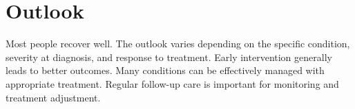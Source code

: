 \section{Outlook}
Most people recover well. The outlook varies depending on the specific condition, severity at diagnosis, and response to treatment. Early intervention generally leads to better outcomes. Many conditions can be effectively managed with appropriate treatment. Regular follow-up care is important for monitoring and treatment adjustment.
